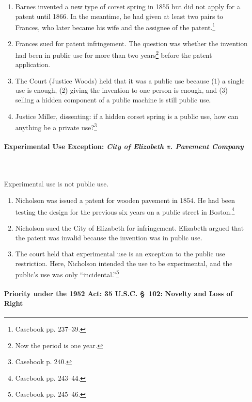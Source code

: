 \begin{enumerate}
    \item Barnes invented a new type of corset spring in 1855 but did not apply 
    for a patent until 1866. In the meantime, he had given at least two pairs to 
    Frances, who later became his wife and the assignee of the 
    patent.\footnote{Casebook pp. 237--39.}
    \item Frances sued for patent infringement. The question was whether the 
    invention had been in public use for more than two years\footnote{Now the 
    period is one year.} before the patent application.
    \item The Court (Justice Woods) held that it was a public use because (1) a 
    single use is enough, (2) giving the invention to one person is enough, and 
    (3) selling a hidden component of a public machine is still public use.
    \item Justice Miller, dissenting: if a hidden corset spring is a public use, 
    how can anything be a private use?\footnote{Casebook p. 240.}
\end{enumerate}

\paragraph{Experimental Use Exception: \emph{City of Elizabeth v. Pavement 
Company}}
~\\\\
Experimental use is not public use.

\begin{enumerate}
    \item Nicholson was issued a patent for wooden pavement in 1854. He had been 
    testing the design for the previous six years on a public street in 
    Boston.\footnote{Casebook pp. 243--44.}
    \item Nicholson sued the City of Elizabeth for infringement. Elizabeth 
    argued that the patent was invalid because the invention was in public use.
    \item The court held that experimental use is an exception to the public use 
    restriction. Here, Nicholson intended the use to be experimental, and the 
    public's use was only ``incidental.''\footnote{Casebook pp. 245--46.}
\end{enumerate}

\paragraph{Priority under the 1952 Act: 35 U.S.C. \S\ 102: Novelty and Loss of 
Right}

